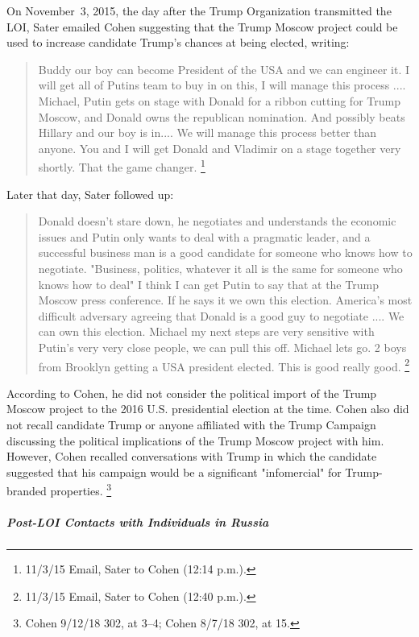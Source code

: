 On November~3, 2015, the day after the Trump Organization transmitted the LOI, Sater emailed Cohen suggesting that the Trump Moscow project could be used to increase candidate Trump's chances at being elected, writing:

\begin{quote}
Buddy our boy can become President of the USA and we can engineer it.
I will get all of Putins team to buy in on this, I will manage this process ....
Michael, Putin gets on stage with Donald for a ribbon cutting for Trump Moscow, and Donald owns the republican nomination.
And possibly beats Hillary and our boy is in....
We will manage this process better than anyone.
You and I will get Donald and Vladimir on a stage together very shortly.
That the game changer.%
\footnote{11/3/15 Email, Sater to Cohen (12:14 p.m.).}
\end{quote}

Later that day, Sater followed up:

\begin{quote}
Donald doesn't stare down, he negotiates and understands the economic issues and Putin only wants to deal with a pragmatic leader, and a successful business man is a good candidate for someone who knows how to negotiate.
"Business, politics, whatever it all is the same for someone who knows how to deal"
I think I can get Putin to say that at the Trump Moscow press conference.
If he says it we own this election.
America's most difficult adversary agreeing that Donald is a good guy to negotiate ....
We can own this election.
Michael my next steps are very sensitive with Putin's very very close people, we can pull this off.
Michael lets go.
2 boys from Brooklyn getting a USA president elected.
This is good really good.%
\footnote{11/3/15 Email, Sater to Cohen (12:40 p.m.).}
\end{quote}

According to Cohen, he did not consider the political import of the Trump Moscow project to the 2016 U.S. presidential election at the time.
Cohen also did not recall candidate Trump or anyone affiliated with the Trump Campaign discussing the political implications of the Trump Moscow project with him.
However, Cohen recalled conversations with Trump in which the candidate suggested that his campaign would be a significant "infomercial" for Trump-branded properties.%
\footnote{Cohen 9/12/18 302, at 3--4; Cohen 8/7/18 302, at 15.}

\subparagraph{Post-LOI Contacts with Individuals in Russia}

